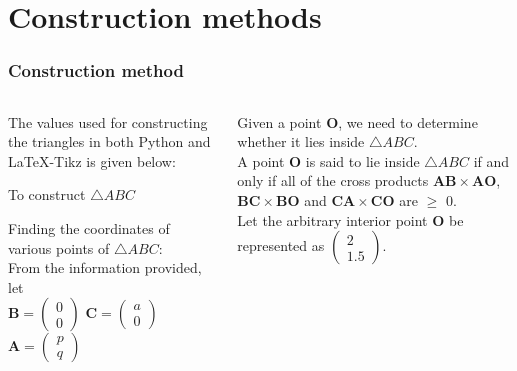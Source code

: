 \documentclass{beamer}
\renewcommand{\vec}[1]{\mathbf{#1}}
\begin{document}
\section*{Construction methods}
\begin{frame}[fragile]
\footnotesize
\frametitle{Construction method}
\begin{columns}
\begin{column}{0.5\textwidth}
The values used for constructing the triangles in both Python and \LaTeX{}-Tikz is given below:
\begin{table}[ht]
    \begin{center}
    	
  \caption{To construct $\triangle ABC$}
   \label{table:table1}
   \end{center}	
\end{table}

Finding the coordinates of various points of  $\triangle ABC$:\\
From the information provided, let\\
    \quad $ \vec{B}= \begin{pmatrix}0\\0\end{pmatrix}$
    \quad $\vec{C}=\begin{pmatrix}a\\0\end{pmatrix}$
    \quad $\vec{A}=\begin{pmatrix}p\\q\end{pmatrix}$
 \end{column}
\begin{column}{0.5\textwidth}   
    Given a point $\vec{O}$, we need to determine whether it lies inside $\triangle ABC$.\\ 
      A point $\vec{O}$ is said to lie inside $\triangle ABC$ if and only if all of the cross products $\vec{AB} \times \vec{AO}$, 
      $\vec{BC} \times \vec{BO}$  and $\vec{CA} \times \vec{CO}$ are $\geqslant$ 0.\\
   

  Let the arbitrary interior point $\vec{O}$ be represented as $\begin{pmatrix}2\\1.5\end{pmatrix}$.\quad

 
    
\end{column}
\end{columns}
\end{frame}
\end{document}

